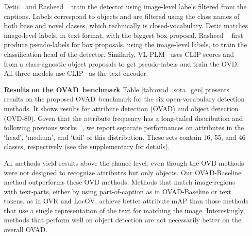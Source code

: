 \documentclass[10pt,twocolumn,letterpaper]{article}
\renewcommand\paragraph[1]{\vspace{0.12cm}\noindent\textbf{#1}}
\newcommand{\modelname}{OVAD-Baseline }
\newcommand{\datasetname}{OVAD}
\newcommand{\taskname}{OVAD}
\begin{document}
Detic~\cite{detic} and Rasheed \etal~\cite{bridging} 
train the detector using image-level labels filtered from the captions. 
Labels correspond to objects and are filtered using the class names of both base and novel classes, which technically is closed-vocabulary.
Detic matches image-level labels, in text format, with the biggest box proposal. Rasheed \etal~\cite{bridging} first produce pseudo-labels for box proposals, using the image-level labels, to train the classification head of the detector. Similarly, VL-PLM~\cite{vl-plm} uses CLIP scores and from a class-agnostic object proposals to get pseudo-labels and train the OVD. All three models use CLIP~\cite{clip} as the text encoder.

\paragraph{Results on the \datasetname\ benchmark} 
Table \ref{tab:ovad_sota_gen} presents results on the proposed \datasetname\ benchmark for the six open-vocabulary detection methods. It shows results for attribute detection (\taskname) and object detection (OVD-80). Given that the attribute frequency has a long-tailed distribution and following previous works ~\cite{lvis, vaw}, we report separate performances on attributes in the `head', `medium', and `tail' of this distribution. 
These sets contain 16, 55, and 46 classes, respectively (see the supplementary for details).

All methods yield results above the chance level, even though the OVD methods were not designed to recognize attributes but only objects. Our \modelname method outperforms these OVD methods. 
Methods that match image-regions with text-parts, either by using part-of-caption as in \modelname or text tokens, as in OVR and LocOV, achieve better attribute mAP than those methods that use a single representation of the text for matching the image.
Interestingly, methods that perform well on object detection are not necessarily better on the overall \taskname. 
\end{document}
